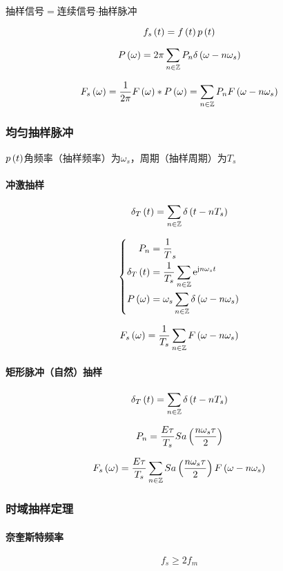 \documentclass{article}
\begin{document}
抽样信号$=$连续信号$\cdot$抽样脉冲

\[f_s\left(t\right)=f\left(t\right) p\left(t\right)\]

\[P\left(\omega\right)=2\pi\sum_{n\in\mathbb Z} P_n\delta\left(\omega-n\omega_s\right)\]

\[F_s\left(\omega\right)=\frac1{2\pi}F\left(\omega\right)\ast P\left(\omega\right)=\sum_{n\in\mathbb Z} P_nF\left(\omega-n\omega_s\right)\]

\subsubsection{均匀抽样脉冲}

$p\left(t\right)$角频率（抽样频率）为$\omega_s$，周期（抽样周期）为$T_s$

\paragraph{冲激抽样}

\[\delta_T\left(t\right)=\sum_{n\in\mathbb Z}\delta\left(t-nT_s\right)\]

\[\left\{\begin{aligned}
        P_n           & =\frac1T_s                                \\
        \delta_T\left(t\right) & =\frac1{T_s}\sum_{n\in\mathbb Z}\mathrm e^{\mathrm j n\omega_s t}     \\
        P\left(\omega\right)   & =\omega_s\sum_{n\in\mathbb Z}\delta\left(\omega-n\omega_s\right)
    \end{aligned}\right.\]

\[F_s\left(\omega\right)=\frac1{T_s}\sum_{n\in\mathbb Z} F\left(\omega-n\omega_s\right)\]

\paragraph{矩形脉冲（自然）抽样}

\[\delta_T\left(t\right)=\sum_{n\in\mathbb Z}\delta\left(t-nT_s\right)\]

\[P_n=\frac{E\tau}{T_s}Sa\left(\frac{n\omega_s\tau}2\right)\]

\[F_s\left(\omega\right)=\frac{E\tau}{T_s}\sum_{n\in\mathbb Z} Sa\left(\frac{n\omega_s\tau}2\right)F\left(\omega-n\omega_s\right)\]

\subsubsection{时域抽样定理}

\paragraph{奈奎斯特频率}

\[f_s\geqslant2f_m\]
\end{document}
